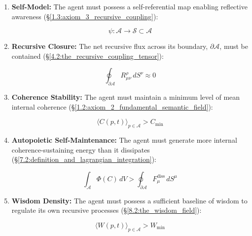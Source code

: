 \begin{enumerate}

    \item \textbf{Self-Model:} The agent must possess a self-referential map enabling reflective awareness (\S\ref{1.3:axiom_3_recursive_coupling}):

    \begin{equation}
        \psi: \mathcal{A} \to \mathcal{S} \subset \mathcal{A}
    \end{equation}

    \item \textbf{Recursive Closure:} The net recursive flux across its boundary, \(\partial \mathcal{A}\), must be contained (\S\ref{4.2:the_recursive_coupling_tensor}):

    \begin{equation}
        \oint_{\partial \mathcal{A}} R^\rho_{\mu\nu} \, dS^\nu \approx 0
    \end{equation}

    \item \textbf{Coherence Stability:} The agent must maintain a minimum level of mean internal coherence (\S\ref{1.2:axiom_2_fundamental_semantic_field}):

    \begin{equation}
        \langle C(p,t) \rangle_{p \in \mathcal{A}} > C_{\text{min}}
    \end{equation}

    \item \textbf{Autopoietic Self-Maintenance:} The agent must generate more internal coherence-sustaining energy than it dissipates (\S\ref{7.2:definition_and_lagrangian_integration}):

    \begin{equation}
        \int_{\mathcal{A}} \Phi(C) \, dV > \oint_{\partial \mathcal{A}} F_\mu^{\text{diss}} \, dS^\mu
    \end{equation}

    \item \textbf{Wisdom Density:} The agent must possess a sufficient baseline of wisdom to regulate its own recursive processes (\S\ref{8.2:the_wisdom_field}):

    \begin{equation}
        \langle W(p,t) \rangle_{p \in \mathcal{A}} > W_{\text{min}}
    \end{equation}

\end{enumerate}

